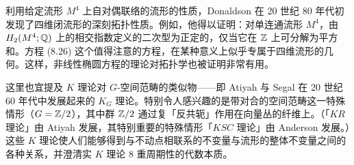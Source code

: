 利用给定流形 $M^4$ 上自对偶联络的流形的性质，Donaldson 在 20 世纪 80 年代初发现了四维闭流形的深刻拓扑性质。例如，他得以证明：对单连通流形 $M^4$，由 $H_2(M^4;\mathbb{Q})$ 上的相交指数定义的二次型为正定的，仅当它在 $\mathbb{Z}$ 上可分解为平方和。方程 (8.26) 这个值得注意的方程，在某种意义上似乎专属于四维流形的几何。这样，非线性椭圆方程的理论对拓扑学也被证明非常有用。

这里也宜提及 $K$ 理论对 $G$-空间范畴的类似物——即 Atiyah 与 Segal 在 20 世纪 60 年代中发展起来的 $K_G$ 理论。特别令人感兴趣的是带对合的空间范畴这一特殊情形（$G=\mathbb{Z}/2$），其中群 $\mathbb{Z}/2$ 通过复「反共轭」作用在向量丛的纤维上。（「$KR$ 理论」由 Atiyah 发展，其特别重要的特殊情形「$KSC$ 理论」由 Anderson 发展。）这些 $K$ 理论使人们能够得到与不动点相联系的不变量与流形的整体不变量之间的各种关系，并澄清实 $K$ 理论 8 重周期性的代数本质。
